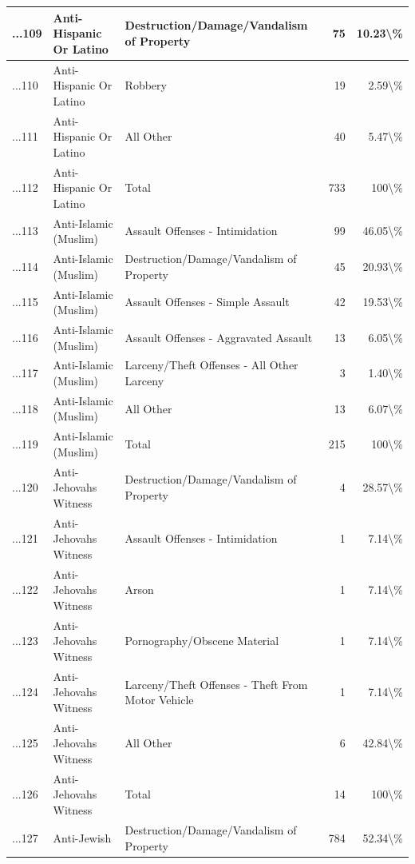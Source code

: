 \documentclass[
]{krantz}
\begin{document}
\begin{longtable}[t]{l|l|l|r|r}
\hline
...109 & Anti-Hispanic Or Latino & Destruction/Damage/Vandalism of Property & 75 & 10.23\textbackslash{}\%\\
\hline
...110 & Anti-Hispanic Or Latino & Robbery & 19 & 2.59\textbackslash{}\%\\
\hline
...111 & Anti-Hispanic Or Latino & All Other & 40 & 5.47\textbackslash{}\%\\
\hline
...112 & Anti-Hispanic Or Latino & Total & 733 & 100\textbackslash{}\%\\
\hline
...113 & Anti-Islamic (Muslim) & Assault Offenses - Intimidation & 99 & 46.05\textbackslash{}\%\\
\hline
...114 & Anti-Islamic (Muslim) & Destruction/Damage/Vandalism of Property & 45 & 20.93\textbackslash{}\%\\
\hline
...115 & Anti-Islamic (Muslim) & Assault Offenses - Simple Assault & 42 & 19.53\textbackslash{}\%\\
\hline
...116 & Anti-Islamic (Muslim) & Assault Offenses - Aggravated Assault & 13 & 6.05\textbackslash{}\%\\
\hline
...117 & Anti-Islamic (Muslim) & Larceny/Theft Offenses - All Other Larceny & 3 & 1.40\textbackslash{}\%\\
\hline
...118 & Anti-Islamic (Muslim) & All Other & 13 & 6.07\textbackslash{}\%\\
\hline
...119 & Anti-Islamic (Muslim) & Total & 215 & 100\textbackslash{}\%\\
\hline
...120 & Anti-Jehovahs Witness & Destruction/Damage/Vandalism of Property & 4 & 28.57\textbackslash{}\%\\
\hline
...121 & Anti-Jehovahs Witness & Assault Offenses - Intimidation & 1 & 7.14\textbackslash{}\%\\
\hline
...122 & Anti-Jehovahs Witness & Arson & 1 & 7.14\textbackslash{}\%\\
\hline
...123 & Anti-Jehovahs Witness & Pornography/Obscene Material & 1 & 7.14\textbackslash{}\%\\
\hline
...124 & Anti-Jehovahs Witness & Larceny/Theft Offenses - Theft From Motor Vehicle & 1 & 7.14\textbackslash{}\%\\
\hline
...125 & Anti-Jehovahs Witness & All Other & 6 & 42.84\textbackslash{}\%\\
\hline
...126 & Anti-Jehovahs Witness & Total & 14 & 100\textbackslash{}\%\\
\hline
...127 & Anti-Jewish & Destruction/Damage/Vandalism of Property & 784 & 52.34\textbackslash{}\%\\

\end{longtable}
\end{document}
